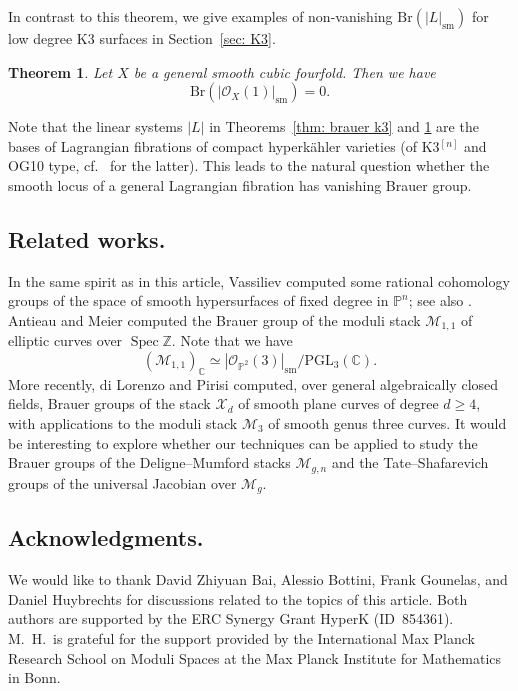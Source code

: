 \documentclass[11pt]{amsart}
\theoremstyle{plain}
\newtheorem{thm}{Theorem}[section]
\theoremstyle{definition}
\theoremstyle{remark}
\begin{document}
In contrast to this theorem, we give examples of non-vanishing $\mathrm{Br}(|L|_\mathrm{sm})$ for low degree K3 surfaces in Section~\ref{sec: K3}. %

\begin{thm}\label{thm: brauer cubic fourfold}
    Let $X$ be a general smooth cubic fourfold. Then we have
    \[
    \mathrm{Br}(|\mathcal{O}_X(1)|_\mathrm{sm}) = 0.
    \]
\end{thm}

Note that the linear systems $|L|$ in Theorems~\ref{thm: brauer k3} and \ref{thm: brauer cubic fourfold} are the bases of Lagrangian fibrations of compact hyperkähler varieties (of K3$^{[n]}$ and OG10 type, cf.~\cite{LSV, Bottini} for the latter). This leads to the natural question whether the smooth locus of a general Lagrangian fibration has vanishing Brauer group.

\subsection{Related works.} In the same spirit as in this article, Vassiliev \cite{Vassiliev} computed some rational cohomology groups of the space of
smooth hypersurfaces of fixed degree in $\mathbb P^n$; see also \cite{Orsola}. Antieau and Meier \cite{AM} computed the Brauer group of the moduli stack $\mathcal{M}_{1,1}$ of elliptic curves over $\operatorname{Spec} \mathbb Z$. Note that we have
\[
(\mathcal{M}_{1,1})_{\mathbb C} \simeq |\mathcal{O}_{\mathbb {P}^2}(3)|_\mathrm{sm} / \mathrm{PGL}_3(\mathbb C).
\]
More recently, di Lorenzo and Pirisi \cite{DiLorenzo-Pirisi} computed, over general algebraically closed fields, Brauer groups of the stack $\mathcal{X}_d$ of smooth plane curves of degree $d\geq 4$, with applications to the moduli stack $\mathcal{M}_3$ of smooth genus three curves. It would be interesting to explore whether our techniques can be applied to study the Brauer groups of the Deligne--Mumford stacks $\mathcal M_{g, n}$ and the Tate--Shafarevich groups of the universal Jacobian over $\mathcal{M}_g$. 

\subsection{Acknowledgments.} We would like to thank David Zhiyuan Bai, Alessio Bottini, Frank Gounelas, and Daniel Huybrechts for discussions related to the topics of this article. Both authors are supported by the ERC
Synergy Grant HyperK (ID~854361). M.\ H.\ is grateful for the support provided by the International Max Planck Research School on Moduli Spaces at the Max Planck Institute for Mathematics in Bonn.
\end{document}
